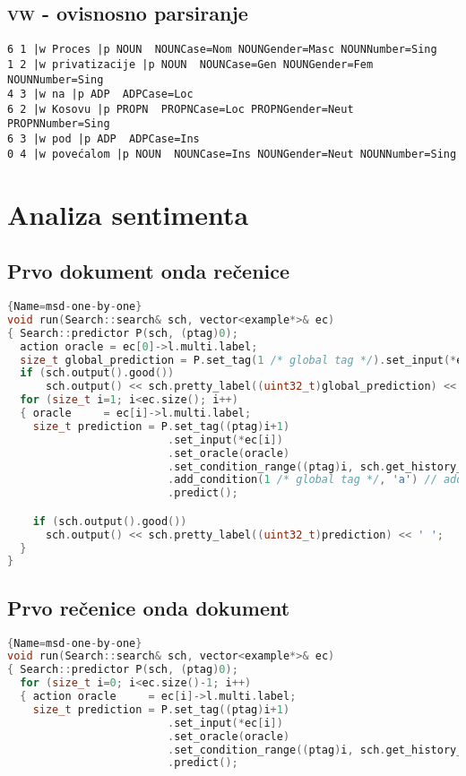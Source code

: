 \begin{appendix}
\section{\textsc{vw} - ovisnosno parsiranje}
\begin{lstlisting}[basicstyle=\tiny\ttfamily]
6 1 |w Proces |p NOUN  NOUNCase=Nom NOUNGender=Masc NOUNNumber=Sing
1 2 |w privatizacije |p NOUN  NOUNCase=Gen NOUNGender=Fem NOUNNumber=Sing
4 3 |w na |p ADP  ADPCase=Loc
6 2 |w Kosovu |p PROPN  PROPNCase=Loc PROPNGender=Neut PROPNNumber=Sing
6 3 |w pod |p ADP  ADPCase=Ins
0 4 |w povećalom |p NOUN  NOUNCase=Ins NOUNGender=Neut NOUNNumber=Sing
\end{lstlisting}

\chapter{Analiza sentimenta}\label{appendix:sentiment}
\section{Prvo dokument onda rečenice}
\begin{lstlisting}[language=C++,
                   basicstyle=\tiny\ttfamily]{Name=msd-one-by-one}
void run(Search::search& sch, vector<example*>& ec)
{ Search::predictor P(sch, (ptag)0);
  action oracle = ec[0]->l.multi.label;
  size_t global_prediction = P.set_tag(1 /* global tag */).set_input(*ec[0]).set_oracle(oracle).predict();
  if (sch.output().good())
      sch.output() << sch.pretty_label((uint32_t)global_prediction) << ' ';
  for (size_t i=1; i<ec.size(); i++)
  { oracle     = ec[i]->l.multi.label;
    size_t prediction = P.set_tag((ptag)i+1)
                         .set_input(*ec[i])
                         .set_oracle(oracle)
                         .set_condition_range((ptag)i, sch.get_history_length(), 'p')
                         .add_condition(1 /* global tag */, 'a') // adds the global as condition on each sequence element
                         .predict();

    if (sch.output().good())
      sch.output() << sch.pretty_label((uint32_t)prediction) << ' ';
  }
}
\end{lstlisting}
\section{Prvo rečenice onda dokument}
\begin{lstlisting}[language=C++,
                   basicstyle=\tiny\ttfamily]{Name=msd-one-by-one}
void run(Search::search& sch, vector<example*>& ec)
{ Search::predictor P(sch, (ptag)0);
  for (size_t i=0; i<ec.size()-1; i++)
  { action oracle     = ec[i]->l.multi.label;
    size_t prediction = P.set_tag((ptag)i+1)
                         .set_input(*ec[i])
                         .set_oracle(oracle)
                         .set_condition_range((ptag)i, sch.get_history_length(), 'p')
                         .predict();


\end{lstlisting}
\end{appendix}
